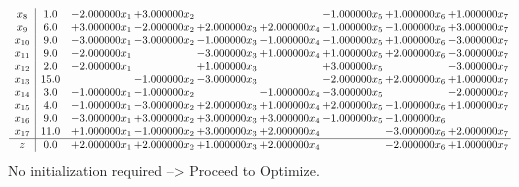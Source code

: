 \documentclass[10pt]{article}
\begin{document}
\[\begin{array}{c| c c@{\hskip 2pt} c@{\hskip 2pt} c@{\hskip 2pt} c@{\hskip 2pt} c@{\hskip 2pt} c@{\hskip 2pt} c@{\hskip 2pt} }
 x_{8}   &  1.0 & -2.000000 x_{1} & + 3.000000 x_{2} &    &   & -1.000000 x_{5} & + 1.000000 x_{6} & + 1.000000 x_{7}\\
 x_{9}   &  6.0 & + 3.000000 x_{1} & -2.000000 x_{2} & + 2.000000 x_{3} & + 2.000000 x_{4} & -1.000000 x_{5} & -1.000000 x_{6} & + 3.000000 x_{7}\\
 x_{10}   &  9.0 & -3.000000 x_{1} & -3.000000 x_{2} & -1.000000 x_{3} & -1.000000 x_{4} & -1.000000 x_{5} & + 1.000000 x_{6} & -3.000000 x_{7}\\
 x_{11}   &  9.0 & -2.000000 x_{1} &   & -3.000000 x_{3} & + 1.000000 x_{4} & + 1.000000 x_{5} & + 2.000000 x_{6} & -3.000000 x_{7}\\
 x_{12}   &  2.0 & -2.000000 x_{1} &   & + 1.000000 x_{3} &   & + 3.000000 x_{5} &   & -3.000000 x_{7}\\
 x_{13}   &  15.0  &   & -1.000000 x_{2} & -3.000000 x_{3} &   & -2.000000 x_{5} & + 2.000000 x_{6} & + 1.000000 x_{7}\\
 x_{14}   &  3.0 & -1.000000 x_{1} & -1.000000 x_{2} &   & -1.000000 x_{4} & -3.000000 x_{5} &   & -2.000000 x_{7}\\
 x_{15}   &  4.0 & -1.000000 x_{1} & -3.000000 x_{2} & + 2.000000 x_{3} & + 1.000000 x_{4} & + 2.000000 x_{5} & -1.000000 x_{6} & + 1.000000 x_{7}\\
 x_{16}   &  9.0 & -3.000000 x_{1} & + 3.000000 x_{2} & + 3.000000 x_{3} & + 3.000000 x_{4} & -1.000000 x_{5} & -1.000000 x_{6} &   \\
 x_{17}   &  11.0 & + 1.000000 x_{1} & -1.000000 x_{2} & + 3.000000 x_{3} & + 2.000000 x_{4} &   & -3.000000 x_{6} & + 2.000000 x_{7}\\
\hline
z    &  0.0 & + 2.000000 x_{1} & + 2.000000 x_{2} & + 1.000000 x_{3} & + 2.000000 x_{4} &   & -2.000000 x_{6} & + 1.000000 x_{7}\\
\end{array}\]
No initialization required --> Proceed to Optimize. 
\end{document}
